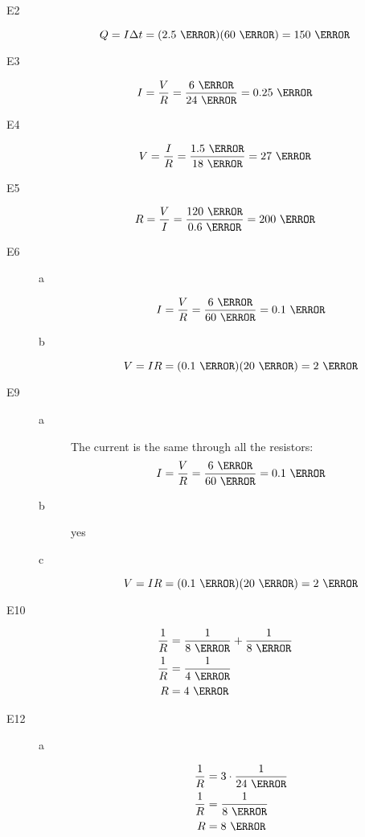 \documentclass{exam}
\begin{document}
\begin{description}

\item[E2]
\[
  Q = I \Delta t = (2.5 \ \ampere)(60 \ \second) = 150 \ \coulomb
\]

\item[E3]
\[
  I = \frac{V}{R} = \frac{6 \ \volt}{24 \ \ohm} = 0.25 \ \ampere
\]

\item[E4]
\[
  V = \frac{I}{R} = \frac{1.5 \ \ampere}{18 \ \ohm} = 27 \ \volt
\]

\item[E5]
\[
  R = \frac{V}{I} = \frac{120 \ \volt}{0.6 \ \ampere} = 200 \ \ohm
\]

\item[E6]
\begin{description}
\item[a]
\[
  I = \frac{V}{R} = \frac{6 \ \volt}{60 \ \ohm} = 0.1 \ \ampere
\]

\item[b]
\[
  V = IR = (0.1 \ \ampere)(20 \ \ohm) = 2 \ \volt
\]
\end{description}

\item[E9]
\begin{description}
\item[a]
The current is the same through all the resistors:
\[
  I = \frac{V}{R} = \frac{6 \ \volt}{60 \ \ohm} = 0.1 \ \ampere
\]

\item[b]
yes

\item[c]
\[
  V = IR = (0.1 \ \ampere)(20 \ \ohm) = 2 \ \volt
\]

\end{description}

\item[E10]
\begin{align*}
  \frac{1}{R} &= \frac{1}{8 \ \ohm} + \frac{1}{8 \ \ohm} \\
  \frac{1}{R} &= \frac{1}{4 \ \ohm} \\
  R           &= 4 \ \ohm \\
\end{align*}


\item[E12]
\begin{description}
\item[a]
\begin{align*}
  \frac{1}{R} &= 3 \cdot \frac{1}{24 \ \ohm} \\
  \frac{1}{R} &= \frac{1}{8 \ \ohm} \\
  R           &= 8 \ \ohm \\
\end{align*}


\end{description}
\end{description}
\end{document}
